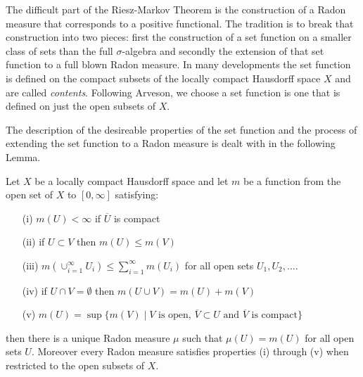 The difficult part of the Riesz-Markov Theorem is the construction of
a Radon measure that corresponds to a positive functional.  The
tradition is to break that construction into two pieces: first the
construction of a set function on a smaller class of sets than the
full $\sigma$-algebra  and secondly the extension of that set function
to a full blown Radon measure. In many developments the set function
is defined on the compact subsets of the  locally compact
Hausdorff space $X$ and are called \emph{contents}.  Following
Arveson, we choose a set function is one
that is defined on just the open subsets of $X$.

The description of the desireable properties of the set function and
the process of extending the set function to a Radon measure is dealt with in the following Lemma.
\begin{lem}\label{ExtensionToRadonMeasure}Let $X$ be a locally compact Hausdorff space and let $m$ be
  a function from the open set of $X$ to $[0,\infty]$ satisfying:
\begin{itemize}
\item[(i)]$m(U) < \infty$ if $\overline{U}$ is compact
\item[(ii)]if $U \subset V$ then $m(U) \leq m(V)$
\item[(iii)]$m(\cup_{i=1}^\infty U_i) \leq \sum_{i=1}^\infty m(U_i)$
  for all open sets $U_1, U_2, \dotsc$.
\item[(iv)]if $U \cap V = \emptyset$ then $m(U \cup V) = m(U) + m(V)$
\item[(v)]$m(U) = \sup \lbrace m(V) \mid V \text{ is open, } \overline{V} \subset U \text{ and }
  \overline{V} \text{ is compact} \rbrace$
\end{itemize}
then there is a unique Radon measure $\mu$ such that $\mu(U) = m(U)$
for all open sets $U$.  Moreover every Radon measure satisfies
properties (i) through (v) when restricted to the open subsets of $X$.
\end{lem}
